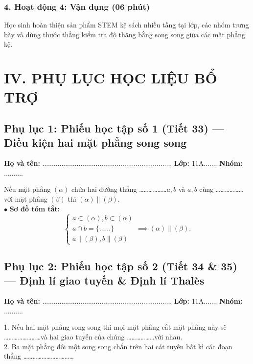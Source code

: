 \documentclass[12pt, a4paper]{article}
\begin{document}
\subsubsection*{4. Hoạt động 4: Vận dụng (06 phút)}
Học sinh hoàn thiện sản phẩm STEM kệ sách nhiều tầng tại lớp, các nhóm trưng bày và dùng thước thẳng kiểm tra độ thăng bằng song song giữa các mặt phẳng kệ.

\newpage

\section*{IV. PHỤ LỤC HỌC LIỆU BỔ TRỢ}

\subsection*{Phụ lục 1: Phiếu học tập số 1 (Tiết 33) --- Điều kiện hai mặt phẳng song song}
\noindent\textbf{Họ và tên:} .................................................................... \textbf{Lớp:} 11A....... \textbf{Nhóm:} ..........

\begin{pedabox}
Nếu mặt phẳng $(\alpha)$ chứa hai đường thẳng \dots\dots\dots\dots\dots\dots $a, b$ và $a, b$ cùng \dots\dots\dots\dots\dots\dots với mặt phẳng $(\beta)$ thì $(\alpha) \parallel (\beta)$.\\[0.4em]
$\bullet$ \textbf{Sơ đồ tóm tắt:}\\
$$\begin{cases} a \subset (\alpha), b \subset (\alpha) \\ a \cap b = \{\dots\dots\} \\ a \parallel (\beta), b \parallel (\beta) \end{cases} \implies (\alpha) \parallel (\beta).$$
\end{pedabox}

\subsection*{Phụ lục 2: Phiếu học tập số 2 (Tiết 34 \& 35) --- Định lí giao tuyến \& Định lí Thalès}
\noindent\textbf{Họ và tên:} .................................................................... \textbf{Lớp:} 11A....... \textbf{Nhóm:} ..........

\begin{pedabox}
1. Nếu hai mặt phẳng song song thì mọi mặt phẳng cắt mặt phẳng này sẽ \dots\dots\dots\dots\dots\dots\dots\dots và hai giao tuyến của chúng \dots\dots\dots\dots\dots\dots với nhau.\\
2. Ba mặt phẳng đôi một song song chắn trên hai cát tuyến bất kì các đoạn thẳng \dots\dots\dots\dots\dots\dots\dots\dots\dots\dots\dots
\end{pedabox}
\end{document}

